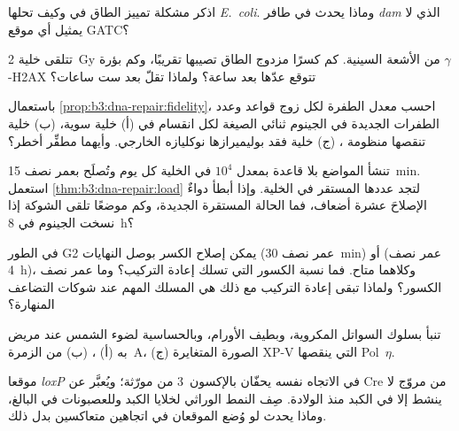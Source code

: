 \begin{exercise}[$\star$]\label{exo:b3:dna-repair:3}
اذكر مشكلة تمييز الطاق في  وكيف تحلها
\emph{E.~coli}. وماذا يحدث في طافر \emph{dam} الذي لا يمثيل أي موقع
GATC؟
\end{exercise}

\begin{exercise}[$\star$]\label{exo:b3:dna-repair:4}
تتلقى خلية \qty{2}{Gy} من الأشعة السينية. كم كسرًا مزدوج الطاق
تصيبها تقريبًا، وكم بؤرة $\gamma$-H2AX تتوقع عدّها بعد ساعة؟ ولماذا
تقلّ بعد ست ساعات؟
\end{exercise}

\begin{exercise}[$\star\star$]\label{exo:b3:dna-repair:5}
باستعمال \cref{prop:b3:dna-repair:fidelity}، احسب معدل الطفرة لكل
زوج قواعد وعدد الطفرات الجديدة في الجينوم ثنائي الصيغة لكل انقسام في
(أ) خلية سوية، (ب) خلية تنقصها منظومة ،
(ج) خلية فقد بوليميرازها نوكليازه الخارجي. وأيهما مطفِّر أخطر؟
\end{exercise}

\begin{exercise}[$\star\star$]\label{exo:b3:dna-repair:6}
تنشأ المواضع بلا قاعدة بمعدل $10^{4}$ في الخلية كل يوم وتُصلَح بعمر
نصف \qty{15}{min}. استعمل \cref{thm:b3:dna-repair:load} لتجد
عددها المستقر في الخلية. وإذا أبطأ دواءٌ الإصلاحَ عشرة أضعاف، فما
الحالة المستقرة الجديدة، وكم موضعًا تلقى الشوكة إذا نسخت الجينوم في
\qty{8}{h}؟
\end{exercise}

\begin{exercise}[$\star\star$]\label{exo:b3:dna-repair:7}
في الطور G2 يمكن إصلاح الكسر بوصل النهايات (عمر نصف \qty{30}{min}) أو
 (عمر نصف \qty{4}{h})، وكلاهما متاح. فما نسبة
الكسور التي تسلك إعادة التركيب؟ وما عمر نصف الكسور؟ ولماذا تبقى
إعادة التركيب مع ذلك هي المسلك المهم عند شوكات التضاعف المنهارة؟
\end{exercise}

\begin{exercise}[$\star\star$]\label{exo:b3:dna-repair:8}
تنبأ بسلوك السواتل المكروية، وبطيف الأورام، وبالحساسية لضوء الشمس
عند مريض به (أ) ، (ب)  من الزمرة~A،
(ج) الصورة المتغايرة XP-V التي ينقصها
Pol~$\eta$.
\end{exercise}

\begin{exercise}[$\star\star$]\label{exo:b3:dna-repair:9}
موقعا \emph{loxP} في الاتجاه نفسه يحفّان بالإكسون~3 من مورّثة؛
ويُعبَّر عن Cre من مروّج لا ينشط إلا في الكبد منذ الولادة.
صِف النمط الوراثي لخلايا الكبد وللعصبونات في البالغ، وماذا يحدث
لو وُضع الموقعان في اتجاهين متعاكسين بدل ذلك.
\end{exercise}

